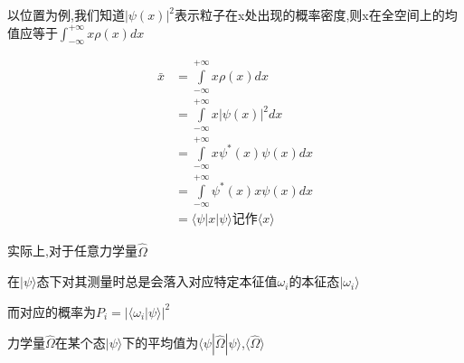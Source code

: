 \documentclass[lang=cn,10pt]{elegantbook}
\begin{document}
 以位置为例,我们知道$|\psi(x)|^2$表示粒子在x处出现的概率密度,则x在全空间上的均值应等于$\int_{-\infty}^{+\infty}x\rho(x)dx$
 
 \begin{equation*}
 	\begin{split}
 		\bar{x}&=\int\limits_{-\infty}^{+\infty}{x\rho \left( x \right) dx}
 		\\
 		&=\int\limits_{-\infty}^{+\infty}{x|\psi \left( x \right) |^2dx}
 		\\
 		&=\int\limits_{-\infty}^{+\infty}{x\psi ^*\left( x \right) \psi \left( x \right) dx}
 		\\
 		&=\int\limits_{-\infty}^{+\infty}{\psi ^*\left( x \right) x\psi \left( x \right) dx}
 		\\
 		&=\langle \psi |x|\psi \rangle \text{记作}\langle x\rangle
 	\end{split}
 \end{equation*}
 
 实际上,对于任意力学量$\hat{\Omega}$
 
 在$|\psi\rangle$态下对其测量时总是会落入对应特定本征值$\omega_i$的本征态$|\omega_i\rangle$
 
 而对应的概率为$P_i =|\langle\omega_i|\psi\rangle|^2$
 
 力学量$\hat{\Omega}$在某个态$|\psi\rangle$下的平均值为$\langle\psi|\hat{\Omega}|\psi\rangle$,$\langle\hat{\Omega}\rangle$
 
\end{document}
